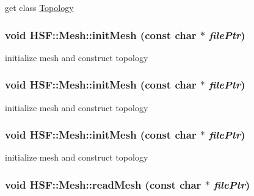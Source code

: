 get class \hyperlink{classHSF_1_1Topology}{Topology} \hypertarget{classHSF_1_1Mesh_aeadaa406bc94ca79dbac39b69f0929a2}{
\subsubsection[{initMesh}]{\setlength{\rightskip}{0pt plus 5cm}void HSF::Mesh::initMesh (const char $\ast$ {\em filePtr})}}
\label{classHSF_1_1Mesh_aeadaa406bc94ca79dbac39b69f0929a2}


initialize mesh and construct topology \hypertarget{classHSF_1_1Mesh_aeadaa406bc94ca79dbac39b69f0929a2}{
\subsubsection[{initMesh}]{\setlength{\rightskip}{0pt plus 5cm}void HSF::Mesh::initMesh (const char $\ast$ {\em filePtr})}}
\label{classHSF_1_1Mesh_aeadaa406bc94ca79dbac39b69f0929a2}


initialize mesh and construct topology \hypertarget{classHSF_1_1Mesh_aeadaa406bc94ca79dbac39b69f0929a2}{
\subsubsection[{initMesh}]{\setlength{\rightskip}{0pt plus 5cm}void HSF::Mesh::initMesh (const char $\ast$ {\em filePtr})}}
\label{classHSF_1_1Mesh_aeadaa406bc94ca79dbac39b69f0929a2}


initialize mesh and construct topology \hypertarget{classHSF_1_1Mesh_aa9073cb283b0b0be1a6131fc14fbabf3}{
\subsubsection[{readMesh}]{\setlength{\rightskip}{0pt plus 5cm}void HSF::Mesh::readMesh (const char $\ast$ {\em filePtr})}}
\label{classHSF_1_1Mesh_aa9073cb283b0b0be1a6131fc14fbabf3}


